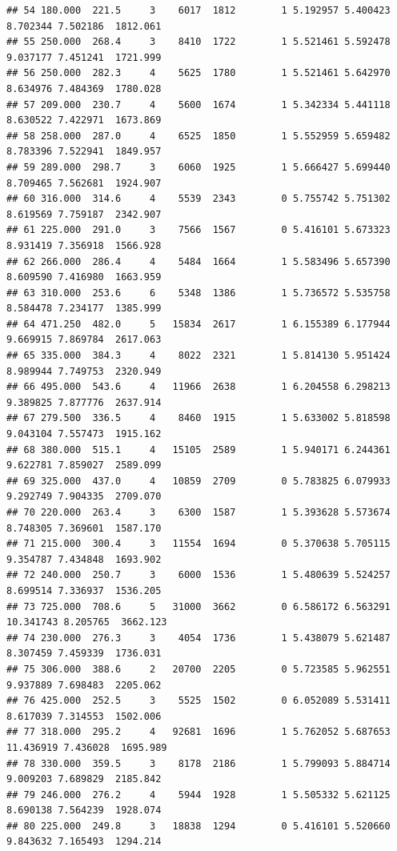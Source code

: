 \documentclass[
]{book}
\theoremstyle{definition}
\theoremstyle{definition}
\theoremstyle{definition}
\theoremstyle{definition}
\theoremstyle{remark}
\begin{document}
\begin{verbatim}
## 54 180.000  221.5     3    6017  1812        1 5.192957 5.400423  8.702344 7.502186  1812.061
## 55 250.000  268.4     3    8410  1722        1 5.521461 5.592478  9.037177 7.451241  1721.999
## 56 250.000  282.3     4    5625  1780        1 5.521461 5.642970  8.634976 7.484369  1780.028
## 57 209.000  230.7     4    5600  1674        1 5.342334 5.441118  8.630522 7.422971  1673.869
## 58 258.000  287.0     4    6525  1850        1 5.552959 5.659482  8.783396 7.522941  1849.957
## 59 289.000  298.7     3    6060  1925        1 5.666427 5.699440  8.709465 7.562681  1924.907
## 60 316.000  314.6     4    5539  2343        0 5.755742 5.751302  8.619569 7.759187  2342.907
## 61 225.000  291.0     3    7566  1567        0 5.416101 5.673323  8.931419 7.356918  1566.928
## 62 266.000  286.4     4    5484  1664        1 5.583496 5.657390  8.609590 7.416980  1663.959
## 63 310.000  253.6     6    5348  1386        1 5.736572 5.535758  8.584478 7.234177  1385.999
## 64 471.250  482.0     5   15834  2617        1 6.155389 6.177944  9.669915 7.869784  2617.063
## 65 335.000  384.3     4    8022  2321        1 5.814130 5.951424  8.989944 7.749753  2320.949
## 66 495.000  543.6     4   11966  2638        1 6.204558 6.298213  9.389825 7.877776  2637.914
## 67 279.500  336.5     4    8460  1915        1 5.633002 5.818598  9.043104 7.557473  1915.162
## 68 380.000  515.1     4   15105  2589        1 5.940171 6.244361  9.622781 7.859027  2589.099
## 69 325.000  437.0     4   10859  2709        0 5.783825 6.079933  9.292749 7.904335  2709.070
## 70 220.000  263.4     3    6300  1587        1 5.393628 5.573674  8.748305 7.369601  1587.170
## 71 215.000  300.4     3   11554  1694        0 5.370638 5.705115  9.354787 7.434848  1693.902
## 72 240.000  250.7     3    6000  1536        1 5.480639 5.524257  8.699514 7.336937  1536.205
## 73 725.000  708.6     5   31000  3662        0 6.586172 6.563291 10.341743 8.205765  3662.123
## 74 230.000  276.3     3    4054  1736        1 5.438079 5.621487  8.307459 7.459339  1736.031
## 75 306.000  388.6     2   20700  2205        0 5.723585 5.962551  9.937889 7.698483  2205.062
## 76 425.000  252.5     3    5525  1502        0 6.052089 5.531411  8.617039 7.314553  1502.006
## 77 318.000  295.2     4   92681  1696        1 5.762052 5.687653 11.436919 7.436028  1695.989
## 78 330.000  359.5     3    8178  2186        1 5.799093 5.884714  9.009203 7.689829  2185.842
## 79 246.000  276.2     4    5944  1928        1 5.505332 5.621125  8.690138 7.564239  1928.074
## 80 225.000  249.8     3   18838  1294        0 5.416101 5.520660  9.843632 7.165493  1294.214

\end{verbatim}
\end{document}

